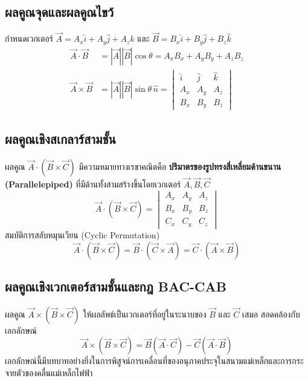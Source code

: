 \subsection{ผลคูณจุดและผลคูณไขว้}
กำหนดเวกเตอร์ $\vec{A} = A_x\hat{i} + A_y\hat{j} + A_z\hat{k}$ และ $\vec{B} = B_x\hat{i} + B_y\hat{j} + B_z\hat{k}$
\begin{align}
\vec{A} \cdot \vec{B} &= |\vec{A}||\vec{B}|\cos\theta = A_x B_x + A_y B_y + A_z B_z \\
\vec{A} \times \vec{B} &= |\vec{A}||\vec{B}|\sin\theta \,\hat{n} = \begin{vmatrix}
\hat{i} & \hat{j} & \hat{k} \\
A_x & A_y & A_z \\
B_x & B_y & B_z
\end{vmatrix}
\end{align}

\subsection{ผลคูณเชิงสเกลาร์สามชั้น}
ผลคูณ $\vec{A} \cdot (\vec{B} \times \vec{C})$ มีความหมายทางเรขาคณิตคือ \textbf{ปริมาตรของรูปทรงสี่เหลี่ยมด้านขนาน (Parallelepiped)} ที่มีด้านทั้งสามสร้างขึ้นโดยเวกเตอร์ $\vec{A}, \vec{B}, \vec{C}$
\begin{equation}
\vec{A} \cdot (\vec{B} \times \vec{C}) = \begin{vmatrix}
A_x & A_y & A_z \\
B_x & B_y & B_z \\
C_x & C_y & C_z
\end{vmatrix}
\end{equation}
สมบัติการสลับหมุนเวียน (Cyclic Permutation)
\begin{equation}
\vec{A} \cdot (\vec{B} \times \vec{C}) = \vec{B} \cdot (\vec{C} \times \vec{A}) = \vec{C} \cdot (\vec{A} \times \vec{B})
\end{equation}

\subsection{ผลคูณเชิงเวกเตอร์สามชั้นและกฎ BAC-CAB}
ผลคูณ $\vec{A} \times (\vec{B} \times \vec{C})$ ให้ผลลัพธ์เป็นเวกเตอร์ที่อยู่ในระนาบของ $\vec{B}$ และ $\vec{C}$ เสมอ สอดคล้องกับเอกลักษณ์
\begin{equation}
\vec{A} \times (\vec{B} \times \vec{C}) = \vec{B}(\vec{A} \cdot \vec{C}) - \vec{C}(\vec{A} \cdot \vec{B})
\end{equation}
เอกลักษณ์นี้มีบทบาทอย่างยิ่งในการพิสูจน์การเคลื่อนที่ของอนุภาคประจุในสนามแม่เหล็กและการกระจายตัวของคลื่นแม่เหล็กไฟฟ้า

